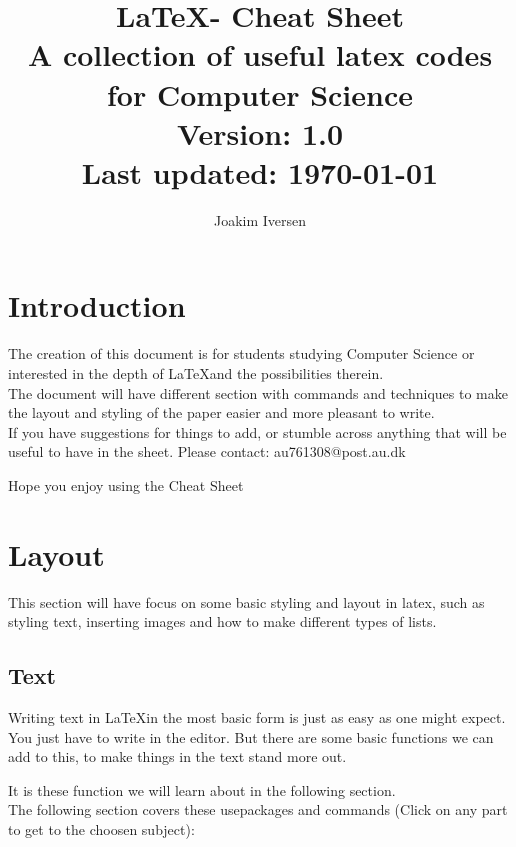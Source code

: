\documentclass{article}
\title{\LaTeX - Cheat Sheet \\
        \large A collection of useful latex codes for Computer Science \\
        Version: 1.0 \\
        Last updated: \today
}
\author{Joakim Iversen}
\date{}
\begin{document}
\begin{titlingpage}
    \maketitle
\end{titlingpage} %
\newpage

\tableofcontents %
\newpage


\section{Introduction}
The creation of this document is for students studying Computer Science or interested in the depth of \LaTeX and the possibilities therein. \\
The document will have different section with commands and techniques to make the layout and styling of the paper easier and more pleasant to write. \\

If you have suggestions for things to add, or stumble across anything that will be useful to have in the sheet. Please contact: au761308@post.au.dk \\
\begin{center}
    Hope you enjoy using the Cheat Sheet \Coffeecup
\end{center}


\newpage

\section{Layout}
This section will have focus on some basic styling and layout in latex, such as styling text, inserting images and how to make different types of lists. \\

\subsection{Text}
Writing text in \LaTeX in the most basic form is just as easy as one might expect. You just have to write in the editor. 
But there are some basic functions we can add to this, to make things in the text stand more out. 

It is these function we will learn about in the following section. \\
The following section covers these usepackages and commands (Click on any part to get to the choosen subject): \\
\end{document}
